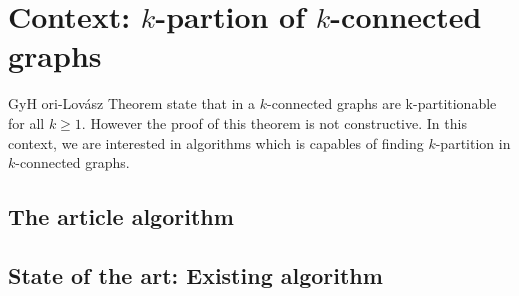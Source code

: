 \section{Context: $k$-partion of $k$-connected graphs}
Gy{H o}ri-Lovász Theorem state that in a $k$-connected graphs are 
k-partitionable for all $k \geq 1$. However the proof of this theorem
is not constructive. In this context, we are interested in algorithms which
is capables of finding $k$-partition in $k$-connected graphs.

\subsection{The article algorithm}

\subsection{State of the art: Existing algorithm}


